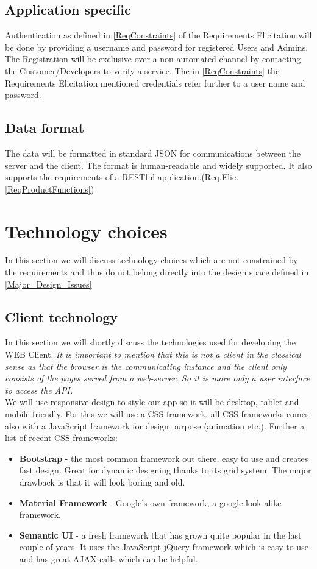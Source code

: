 \documentclass[a4paper,11pt]{article}
\begin{document}
\subsection{Application specific}
Authentication as defined in \ref{ReqConstraints} of the Requirements Elicitation will be done by providing a username and password for registered Users and Admins. The Registration will be exclusive over  a non automated channel by contacting the Customer/Developers to verify a service. The in \ref{ReqConstraints} the Requirements Elicitation mentioned credentials refer further to a user name and password.

\subsection{Data format}
The data will be formatted in standard JSON for communications between the server and the client. The format is human-readable and widely supported. It also supports the requirements of a RESTful application.(Req.Elic. \ref{ReqProductFunctions})

\section{Technology choices} \label{Technology_choices}
In this section we will discuss technology choices which are not constrained by the requirements and thus do not belong directly into the design space defined in \ref{Major_Design_Issues}

\subsection{Client technology}
 In this section we will shortly discuss the technologies used for developing the WEB Client. \textit{It is important to mention that this is not a client in the classical sense as that the browser is the communicating instance and the client only consists of the pages served from a web-server. So it is more only a user interface to access the API.} \\
 We will use responsive design to style our app so it will be desktop, tablet and mobile friendly. For this we will use a CSS framework, all CSS frameworks comes also with a JavaScript framework for design purpose (animation etc.). Further a list of recent CSS frameworks:

\begin{itemize}
\item
  \textbf{Bootstrap} - the most common framework out there, easy to use
  and creates fast design. Great for dynamic designing thanks to its
  grid system. The major drawback is that it will look boring and old.
\item
  \textbf{Material Framework} - Google's own framework, a google look
  alike framework.
\item
  \textbf{Semantic UI} - a fresh framework that has grown quite popular
  in the last couple of years. It uses the JavaScript jQuery framework
  which is easy to use and has great AJAX calls which can be helpful.
\end{itemize}
\end{document}
